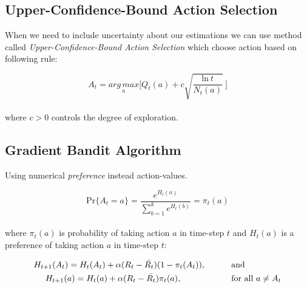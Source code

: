 \documentclass[12pt]{article}
\begin{document}
    \subsection{Upper-Confidence-Bound Action Selection}
    When we need to include uncertainty about our estimations we can use method called 
    \textit{Upper-Confidence-Bound Action Selection} which choose action based on following rule:

    \begin{equation}
        A_t = \underset{a}{arg\,max} \Bigg[ Q_t(a) + c \sqrt{\frac{\text{ln}\ t}{N_t(a)}}\  \Bigg]
    \end{equation}
    \\
    where $c > 0$ controls the degree of exploration.

    \subsection{Gradient Bandit Algorithm}
    Using numerical \textit{preference} instead action-values.

    \begin{equation}
        \text{Pr}\{A_t=a\} = \frac{e^{H_t(a)}}{\sum_{b=1}^{k}e^{H_t(b)}} = \pi_t(a)
    \end{equation}
    \\
    where $\pi_t(a)$ is probability of taking action $a$ in time-step $t$ and 
    $H_t(a)$ is a preference of taking action $a$ in time-step $t$:


    \begin{equation}
        \begin{split}
            H_{t+1}(A_t) = H_{t}(A_t) + \alpha (R_t -\bar{R_t})(1 - \pi_t(A_t)) 
            \text{, \hspace{1cm}} &  \text{and} \\
            H_{t+1}(a) = H_{t}(a) + \alpha (R_t -\bar{R_t})\pi_t(a) 
            \text{, \hspace{2cm}} & \text{for all $a \neq A_t$}
        \end{split}
    \end{equation}
\end{document}

